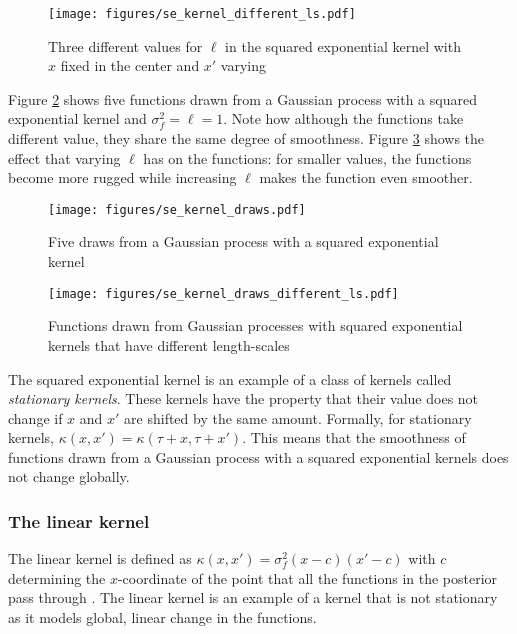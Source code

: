\documentclass[a4paper,12pt,twoside,openright]{report}
\begin{document}
\begin{figure}
\centering
  \texttt{[image: figures/se\_kernel\_different\_ls.pdf]}
  \caption{Three different values for $\ell$ in the squared exponential kernel with $x$ fixed in the center and $x'$ varying}
  \label{sekernel_ls}
\end{figure}

Figure \ref{sekernel_draws} shows five functions drawn from a Gaussian process with a squared exponential kernel and $\sigma_f^2 = \ell = 1$. Note how although the functions take different value, they share the same degree of smoothness. Figure \ref{sekernel_draws_different_ls} shows the effect that varying $\ell$ has on the functions: for smaller values, the functions become more rugged while increasing $\ell$ makes the function even smoother.


\begin{figure}
\centering
  \texttt{[image: figures/se\_kernel\_draws.pdf]}
  \caption{Five draws from a Gaussian process with a squared exponential kernel}
  \label{sekernel_draws}
\end{figure}

\begin{figure}
\centering
  \texttt{[image: figures/se\_kernel\_draws\_different\_ls.pdf]}
  \caption{Functions drawn from Gaussian processes with squared exponential kernels that have different length-scales}
  \label{sekernel_draws_different_ls}
\end{figure}

The squared exponential kernel is an example of a class of kernels called \emph{stationary kernels}. These kernels  have the property that their value does not change if $x$ and $x'$ are shifted by the same amount. Formally, for stationary kernels, $\kappa(x, x') = \kappa(\tau + x, \tau + x')$. This means that the smoothness of functions drawn from a Gaussian process with a squared exponential kernels does not change globally.


\subsubsection{The linear kernel}
The linear kernel is defined as $\kappa(x, x') = \sigma_f^2(x-c)(x'-c)$ with $c$ determining the $x$-coordinate of the point that all the functions in the posterior pass through \cite{duvenaudthesis}. The linear kernel is an example of a kernel that is not stationary as it models global, linear change in the functions.
\end{document}
